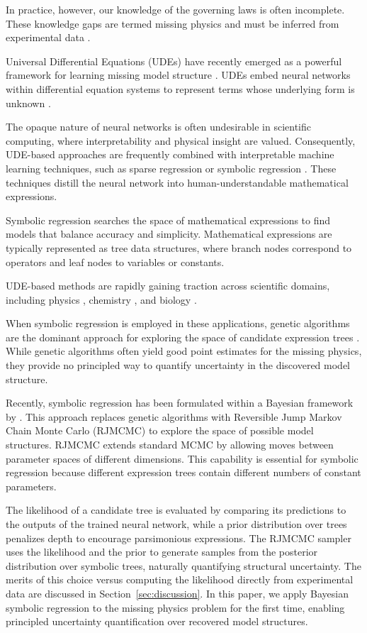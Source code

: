 \documentclass{ifacconf}
\begin{document}
	In practice, however, our knowledge of the governing laws is often incomplete.
	These knowledge gaps are termed missing physics and must be inferred from experimental data \citep{harlim}.
	
	Universal Differential Equations (UDEs) have recently emerged as a powerful framework for learning missing model structure \citep{rackauckas1}.
	UDEs embed neural networks within differential equation systems to represent terms whose underlying form is unknown \citep{dandekar}.
	
	The opaque nature of neural networks is often undesirable in scientific computing, where interpretability and physical insight are valued.
	Consequently, UDE-based approaches are frequently combined with interpretable machine learning techniques, such as sparse regression \citep{kaiser} or symbolic regression \citep{koza}.
	These techniques distill the neural network into human-understandable mathematical expressions.
	
	Symbolic regression searches the space of mathematical expressions to find models that balance accuracy and simplicity.
	Mathematical expressions are typically represented as tree data structures, where branch nodes correspond to operators and leaf nodes to variables or constants.
	
	UDE-based methods are rapidly gaining traction across scientific domains, including physics \citep{keithLearningOrbitalDynamics2021}, chemistry \citep{santanaEfficientHybridModeling2023}, and biology \citep{philippsNonNegativeUniversalDifferential2024, rojas-camposLearningCOVID19Regional2023}.
	
	When symbolic regression is employed in these applications, genetic algorithms are the dominant approach for exploring the space of candidate expression trees \citep{cranmer}.
	While genetic algorithms often yield good point estimates for the missing physics, they provide no principled way to quantify uncertainty in the discovered model structure.
	
	Recently, symbolic regression has been formulated within a Bayesian framework by \citet{jin}.
	This approach replaces genetic algorithms with Reversible Jump Markov Chain Monte Carlo (RJMCMC) to explore the space of possible model structures.
	RJMCMC extends standard MCMC by allowing moves between parameter spaces of different dimensions.
	This capability is essential for symbolic regression because different expression trees contain different numbers of constant parameters.
	
	The likelihood of a candidate tree is evaluated by comparing its predictions to the outputs of the trained neural network, while a prior distribution over trees penalizes depth to encourage parsimonious expressions.
	The RJMCMC sampler uses the likelihood and the prior to generate samples from the posterior distribution over symbolic trees, naturally quantifying structural uncertainty.
	The merits of this choice versus computing the likelihood directly from experimental data are discussed in Section~\ref{sec:discussion}.
	In this paper, we apply Bayesian symbolic regression to the missing physics problem for the first time, enabling principled uncertainty quantification over recovered model structures.
	
\end{document}
